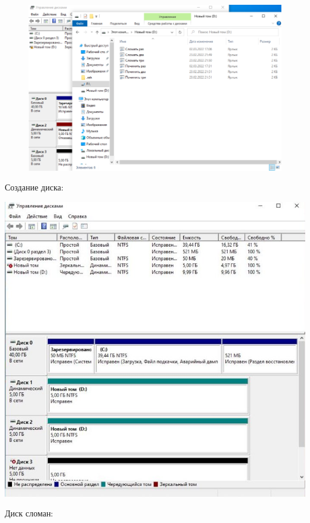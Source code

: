 \documentclass[a4paper,14pt]{extarticle}
\begin{document}
\begin{enumerate}
\begin{figure}
			\caption{}
			\label{fig:screenshot005}
		\end{figure}
		\begin{figure}
			\centering
			\includegraphics[width=0.7\linewidth]{screenshot006}
			\caption{}
			\label{fig:screenshot006}
		\end{figure}
		
		Создание диска:
		\begin{center}
			\includegraphics[width=\textwidth]{1}
		\end{center}
	
		\newpage
		Диск сломан:
		

\end{enumerate}
\end{document}

